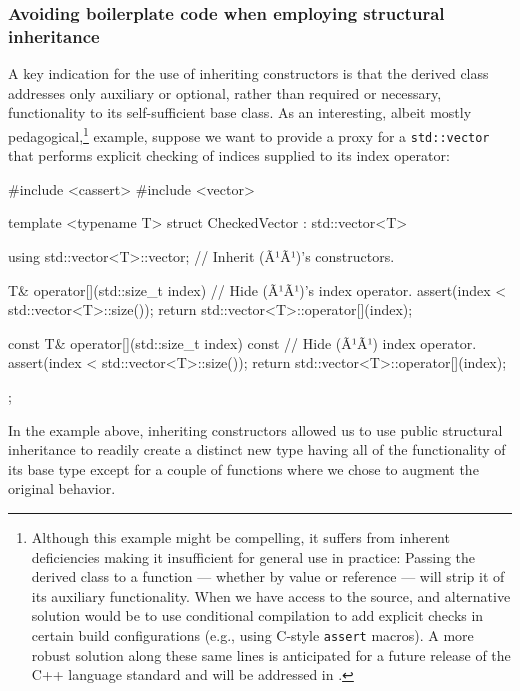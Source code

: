 \subsubsection[Avoiding boilerplate code when employing structural inheritance]{Avoiding boilerplate code when employing structural inheritance}\label{avoiding-boilerplate-code-code-when-employing-structural-inheritance}

A key indication for the use of inheriting constructors is that the
derived class addresses only auxiliary or optional, rather than required
or necessary, functionality to its self-sufficient base class. As an
interesting, albeit mostly pedagogical,{\cprotect\footnote{Although this example might be compelling, it suffers from inherent deficiencies making it insufficient for general use in practice: Passing the derived class to a function --- whether by value or reference --- will
strip it of its auxiliary functionality. When we have access to the source, and alternative solution would be to use conditional compilation to add explicit checks in certain build configurations (e.g., using C-style \lstinline!assert! macros). A more robust solution along these same lines is anticipated for a future release of the C++ language standard and will be addressed in \cite{lakos23}.}} example, suppose we
want to provide a proxy for a \lstinline!std::vector! that performs
explicit checking of indices supplied to its index operator:

\begin{emcppslisting}[language=C++]
#include <cassert>                                                              
#include <vector>

template <typename T>
struct CheckedVector : std::vector<T>
{
    using std::vector<T>::vector;      // Inherit (Ã¹{}Ã¹)'s constructors.

    T& operator[](std::size_t index)   // Hide (Ã¹{}Ã¹)'s index operator.
    {
         assert(index < std::vector<T>::size());
         return std::vector<T>::operator[](index);
    }

    const T& operator[](std::size_t index) const  // Hide (Ã¹{}Ã¹) index operator.
    {
         assert(index < std::vector<T>::size());
         return std::vector<T>::operator[](index);
    }
};
\end{emcppslisting}
    
\noindent In the example above, inheriting constructors allowed us to use public
structural inheritance to readily create a distinct new type having
all of the functionality of its base type except for a couple of
functions where we chose to augment the original behavior.


